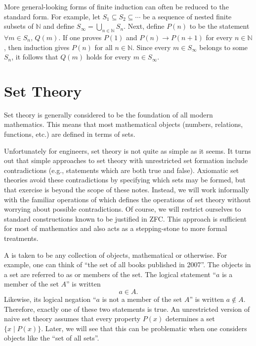 More general-looking forms of finite induction can often be reduced to the standard form.
For example, let $S_1\subseteq S_2\subseteq\cdots$ be a sequence of nested finite subsets of $\mathbb N$ and define $S_\infty=\bigcup_{n\in\mathbb N}S_n$.
Next, define $P(n)$ to be the statement $\forall m\in S_n,\,Q(m)$.
If one proves $P(1)$ and $P(n)\to P(n+1)$ for every $n\in \mathbb{N}$, then induction gives $P(n)$ for all $n\in \mathbb{N}$.
Since every $m\in S_\infty$ belongs to some $S_n$, it follows that $Q(m)$ holds for every $m\in S_\infty$.

\section{Set Theory}
Set theory is generally considered to be the foundation of all modern mathematics.
This means that most mathematical objects (numbers, relations, functions, etc.) are defined in terms of sets.

Unfortunately for engineers, set theory is not quite as simple as it seems.
It turns out that simple approaches to set theory with unrestricted set formation include contradictions (e.g., statements which are both true and false).
Axiomatic set theories avoid these contradictions by specifying which sets may be formed, but that exercise is beyond the scope of these notes.
Instead, we will work informally with the familiar operations of  which defines the operations of set theory without worrying about possible contradictions.
Of course, we will restrict ourselves to standard constructions known to be justified in ZFC.
This approach is sufficient for most of mathematics and also acts as a stepping-stone to more formal treatments.

A  is taken to be any collection of objects, mathematical or otherwise.
For example, one can think of ``the set of all books published in 2007''.
The objects in a set are referred to as  or members of the set.
The logical statement ``$a$ is a member of the set $A$'' is written
\[ a \in A. \]
Likewise, its logical negation ``$a$ is not a member of the set $A$'' is written $a \notin A$.
Therefore, exactly one of these two statements is true.
An unrestricted version of naive set theory assumes that every property $P(x)$ determines a set $\{x\mid P(x)\}$.
Later, we will see that this can be problematic when one considers objects like the ``set of all sets''.

